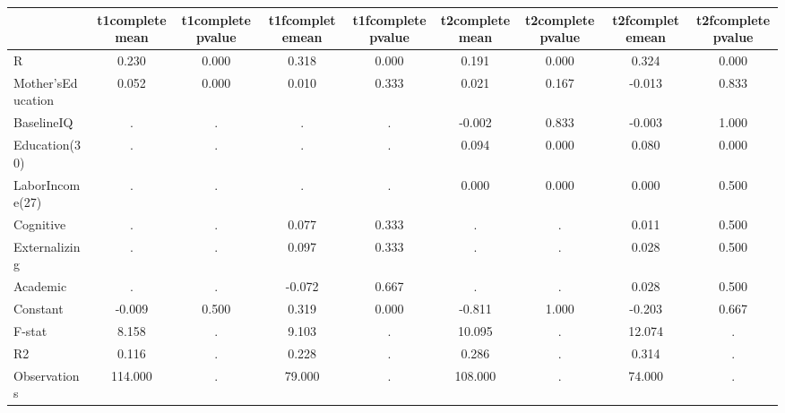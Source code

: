\begin{table}[htbp]
\begin{tabular}{lcccccccc} \hline \hline
 & t1completemean  & t1completepvalue  & t1fcompletemean  & t1fcompletepvalue  & t2completemean  & t2completepvalue  & t2fcompletemean  & t2fcompletepvalue  \\  \hline 
R &     0.230 &     0.000 &     0.318 &     0.000 &     0.191 &     0.000 &     0.324 &     0.000 \\  
Mother'sEducation &     0.052 &     0.000 &     0.010 &     0.333 &     0.021 &     0.167 &    -0.013 &     0.833 \\  
BaselineIQ &         . &         . &         . &         . &    -0.002 &     0.833 &    -0.003 &     1.000 \\  
Education(30) &         . &         . &         . &         . &     0.094 &     0.000 &     0.080 &     0.000 \\  
LaborIncome(27) &         . &         . &         . &         . &     0.000 &     0.000 &     0.000 &     0.500 \\  
Cognitive &         . &         . &     0.077 &     0.333 &         . &         . &     0.011 &     0.500 \\  
Externalizing &         . &         . &     0.097 &     0.333 &         . &         . &     0.028 &     0.500 \\  
Academic &         . &         . &    -0.072 &     0.667 &         . &         . &     0.028 &     0.500 \\  
Constant &    -0.009 &     0.500 &     0.319 &     0.000 &    -0.811 &     1.000 &    -0.203 &     0.667 \\  
F-stat &     8.158 &         . &     9.103 &         . &    10.095 &         . &    12.074 &         . \\  
R2 &     0.116 &         . &     0.228 &         . &     0.286 &         . &     0.314 &         . \\  
Observations &   114.000 &         . &    79.000 &         . &   108.000 &         . &    74.000 &         . \\  
\hline \hline \end{tabular}
\end{table}
